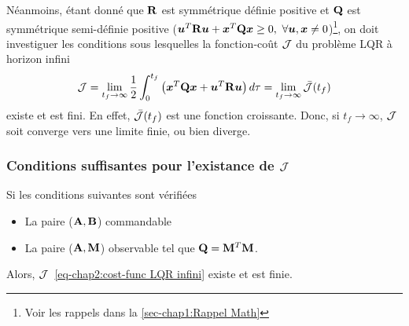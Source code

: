Néanmoins, étant donné que $\mathbf{R}$ est symmétrique définie positive et $\mathbf{Q}$ est symmétrique semi-définie positive ($ \bm{u}^T\mathbf{R}\bm{u}+\bm{x}^T\mathbf{Q}\bm{x}\geq0, \ \forall \bm{u},\bm{x}\neq0$)\footnote{Voir les rappels dans la \cref{sec-chap1:Rappel Math}},  on doit investiguer les conditions sous lesquelles la fonction-coût ${\cal J}$ du problème LQR à horizon infini
\begin{equation}\label{eq-chap2:cost-func LQR infini}
{\cal J} = \lim\limits_{t_f\rightarrow\infty}\frac{1}{2}\int_{0}^{t_f}\left(\bm{x}^T\mathbf{Q}\bm{x} + \bm{u}^T\mathbf{R}\bm{u}\right) d\tau = \lim\limits_{t_f\rightarrow\infty}\bar{\cal J}(t_f)
\end{equation} 
existe et est fini. En effet, $\bar{\cal J}(t_f)$ est une fonction croissante. Donc, si $t_f\rightarrow\infty$, ${\cal J}$ soit converge vers une limite finie, ou bien diverge. 
\subsubsection{Conditions suffisantes pour l'existance de ${\cal J}$}
Si les conditions suivantes sont vérifiées
\begin{itemize}
	\item La paire ($\mathbf{A},\mathbf{B}$) commandable
	\item La paire ($\mathbf{A},\mathbf{M}$) observable tel que $\mathbf{Q}=\mathbf{M}^T\mathbf{M}$.
\end{itemize}
Alors, ${\cal J}$~\eqref{eq-chap2:cost-func LQR infini} existe et est finie.
